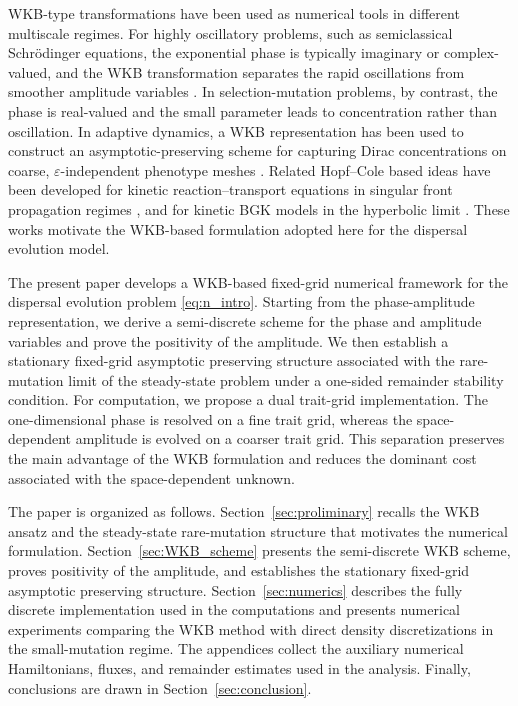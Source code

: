 \documentclass[11pt]{article}
\begin{document}
WKB-type transformations have been used as numerical tools in different multiscale regimes. For highly oscillatory problems, such as semiclassical Schr\"odinger equations, the exponential phase is typically imaginary or complex-valued, and the WKB transformation separates the rapid oscillations from smoother amplitude variables \cite{ArnoldAbdallahNegulescu2011,KoernerArnoldDoepfner2022}. In selection-mutation problems, by contrast, the phase is real-valued and the small parameter leads to concentration rather than oscillation. In adaptive dynamics, a WKB representation has been used to construct an asymptotic-preserving scheme for capturing Dirac concentrations on coarse, \(\varepsilon\)-independent phenotype meshes \cite{AlmeidaPerthameRuan}. Related Hopf--Cole based  ideas have been developed for kinetic reaction--transport equations in singular front propagation regimes \cite{Hivert2018}, and for kinetic BGK models in the hyperbolic limit \cite{LuoPayne2017}. These works motivate the WKB-based formulation adopted here for the dispersal evolution model.






The present paper develops a WKB-based fixed-grid numerical framework for the
dispersal evolution problem \eqref{eq:n_intro}.  Starting from the
phase-amplitude representation, we derive a semi-discrete scheme for the phase
and amplitude variables and prove the positivity of the amplitude.  We then
establish a stationary fixed-grid asymptotic preserving structure associated with the
rare-mutation limit of the steady-state problem under a one-sided remainder
stability condition.  For computation, we propose a dual trait-grid
implementation.  The one-dimensional phase is resolved on a fine trait grid,
whereas the space-dependent amplitude is evolved on a coarser trait grid.  This
separation preserves the main advantage of the WKB formulation and reduces the
dominant cost associated with the space-dependent unknown.





The paper is organized as follows.  Section~\ref{sec:proliminary} recalls the WKB ansatz and the
steady-state rare-mutation structure that motivates the numerical formulation.
Section~\ref{sec:WKB_scheme} presents the semi-discrete WKB scheme, proves positivity of the
amplitude, and establishes the stationary fixed-grid asymptotic preserving structure.  Section~\ref{sec:numerics}
describes the fully discrete implementation used in the computations and
presents numerical experiments comparing the WKB method with direct density
discretizations in the small-mutation regime.  The appendices collect the
auxiliary numerical Hamiltonians, fluxes, and remainder estimates used in the
analysis.  
Finally, conclusions are drawn in Section~\ref{sec:conclusion}.
\end{document}

